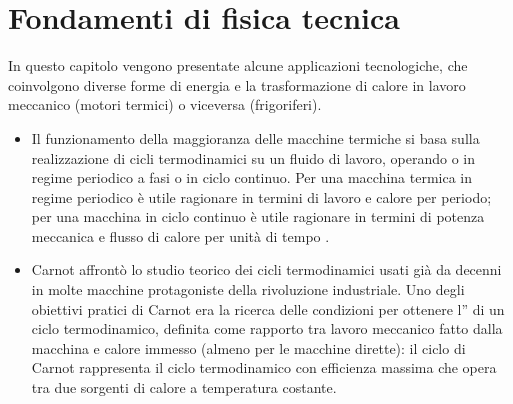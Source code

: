 \documentclass[letterpaper,10pt,italian]{jupyterBook}
\begin{document}
\sphinxstepscope


\chapter{Fondamenti di fisica tecnica}
\label{\detokenize{ch/thermodynamics/heat-engine:fondamenti-di-fisica-tecnica}}\label{\detokenize{ch/thermodynamics/heat-engine:physics-hs-thermodynamics-heat-engine}}\label{\detokenize{ch/thermodynamics/heat-engine::doc}}
\sphinxAtStartPar
In questo capitolo vengono presentate alcune applicazioni tecnologiche, che coinvolgono diverse forme di energia e la trasformazione di calore in lavoro meccanico (motori termici) o viceversa (frigoriferi).
\begin{itemize}
\item {} 
\sphinxAtStartPar
{} Il funzionamento della maggioranza delle macchine termiche si basa sulla realizzazione di cicli termodinamici su un fluido di lavoro, operando o in regime periodico a fasi o in ciclo continuo. Per una macchina termica in regime periodico è utile ragionare in termini di lavoro e calore per periodo; per una macchina in ciclo continuo è utile ragionare in termini di potenza meccanica e flusso di calore per unità di tempo \sphinxstylestrong{(!!!)}.  

\item {} 
\sphinxAtStartPar
{} Carnot affrontò lo studio teorico dei cicli termodinamici usati già da decenni in molte macchine protagoniste della rivoluzione industriale. Uno degli obiettivi pratici di Carnot era la ricerca delle condizioni per ottenere l” di un ciclo termodinamico, definita come rapporto tra lavoro meccanico fatto dalla macchina e calore immesso (almeno per le macchine dirette): il ciclo di Carnot rappresenta il ciclo termodinamico con efficienza massima che opera tra due sorgenti di calore a temperatura costante.


\end{itemize}
\end{document}
